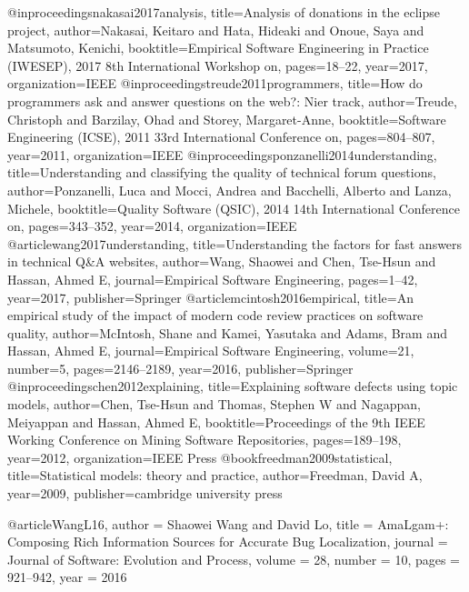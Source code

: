 @inproceedings{nakasai2017analysis,
  title={Analysis of donations in the eclipse project},
  author={Nakasai, Keitaro and Hata, Hideaki and Onoue, Saya and Matsumoto, Kenichi},
  booktitle={Empirical Software Engineering in Practice (IWESEP), 2017 8th International Workshop on},
  pages={18--22},
  year={2017},
  organization={IEEE}
}
@inproceedings{treude2011programmers,
  title={How do programmers ask and answer questions on the web?: Nier track},
  author={Treude, Christoph and Barzilay, Ohad and Storey, Margaret-Anne},
  booktitle={Software Engineering (ICSE), 2011 33rd International Conference on},
  pages={804--807},
  year={2011},
  organization={IEEE}
}
@inproceedings{ponzanelli2014understanding,
  title={Understanding and classifying the quality of technical forum questions},
  author={Ponzanelli, Luca and Mocci, Andrea and Bacchelli, Alberto and Lanza, Michele},
  booktitle={Quality Software (QSIC), 2014 14th International Conference on},
  pages={343--352},
  year={2014},
  organization={IEEE}
}
@article{wang2017understanding,
  title={Understanding the factors for fast answers in technical Q\&A websites},
  author={Wang, Shaowei and Chen, Tse-Hsun and Hassan, Ahmed E},
  journal={Empirical Software Engineering},
  pages={1--42},
  year={2017},
  publisher={Springer}
}
@article{mcintosh2016empirical,
  title={An empirical study of the impact of modern code review practices on software quality},
  author={McIntosh, Shane and Kamei, Yasutaka and Adams, Bram and Hassan, Ahmed E},
  journal={Empirical Software Engineering},
  volume={21},
  number={5},
  pages={2146--2189},
  year={2016},
  publisher={Springer}
}
@inproceedings{chen2012explaining,
  title={Explaining software defects using topic models},
  author={Chen, Tse-Hsun and Thomas, Stephen W and Nagappan, Meiyappan and Hassan, Ahmed E},
  booktitle={Proceedings of the 9th IEEE Working Conference on Mining Software Repositories},
  pages={189--198},
  year={2012},
  organization={IEEE Press}
}
@book{freedman2009statistical,
  title={Statistical models: theory and practice},
  author={Freedman, David A},
  year={2009},
  publisher={cambridge university press}
}

@article{WangL16,
  author    = {Shaowei Wang and
               David Lo},
  title     = {AmaLgam+: Composing Rich Information Sources for Accurate Bug Localization},
  journal   = {Journal of Software: Evolution and Process},
  volume    = {28},
  number    = {10},
  pages     = {921--942},
  year      = {2016}
}
